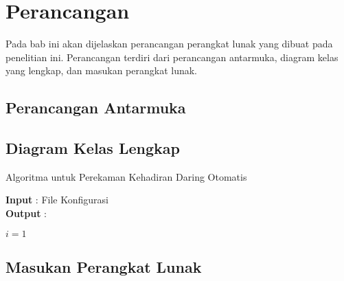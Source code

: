 \chapter{Perancangan}
\label{chap:perancangan}
Pada bab ini akan dijelaskan perancangan perangkat lunak yang dibuat pada penelitian ini. Perancangan terdiri dari perancangan antarmuka, diagram kelas yang lengkap, dan masukan perangkat lunak.

\section{Perancangan Antarmuka}
\label{sec:antarmuka} 

\section{Diagram Kelas Lengkap}
\label{sec:diagram} 
	\begin{algorithm}
		\caption{Algoritma untuk Perekaman Kehadiran Daring Otomatis}\label{euclid}
		\hspace*{\algorithmicindent} \textbf{Input} : File Konfigurasi\\
		\hspace*{\algorithmicindent} \textbf{Output} :
		\begin{algorithmic}[1]
			\State $i = 1$
			

			
		\end{algorithmic}
	\end{algorithm}


\section{Masukan Perangkat Lunak}
\label{sec:config} 
